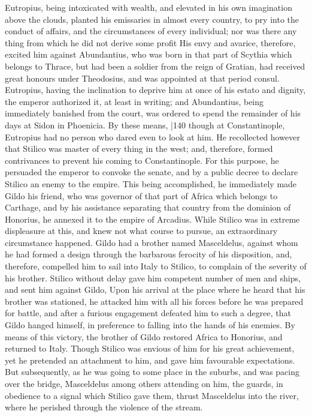 Eutropius, being intoxicated with wealth, and elevated in his own imagination above the clouds, planted his emissaries in almost every country, to pry into the conduct of affairs, and the circumstances of every individual; nor was there any thing from which he did not derive some profit His envy and avarice, therefore, excited him against Abundantius, who was born in that part of Scythia which belongs to Thrace, but had been a soldier from the reign of Gratian, had received great honours under Theodosius, and was appointed at that period consul. Eutropius, having the inclination to deprive him at once of his estato and dignity, the emperor authorized it, at least in writing; and Abundantius, being immediately banished from the court, was ordered to spend the remainder of his days at Sidon in Phoenicia. By these means,
|140 though at Constantinople, Eutropius had no person who dared even to look at him. He recollected however that Stilico was master of every thing in the west; and, therefore, formed contrivances to prevent his coming to Constantinople. For this purpose, he persuaded the emperor to convoke the senate, and by a public decree to declare Stilico an enemy to the empire. This being accomplished, he immediately made Gildo his friend, who was governor of that part of Africa which belongs to Carthage, and by his assistance separating that country from the dominion of Honorius, he annexed it to the empire of Arcadius. While Stilico was in extreme displeasure at this, and knew not what course to pursue, an extraordinary circumstance happened. Gildo had a brother named Masceldelus, against whom he had formed a design through the barbarous ferocity of his disposition, and, therefore, compelled him to sail into Italy to Stilico, to complain of the severity of his brother. Stilico without delay gave him competent number of men and ships, and sent him against Gildo, Upon his arrival at the place where he heard that his brother was stationed, he attacked him with all his forces before he was prepared for battle, and after a furious engagement defeated him to such a degree, that Gildo hanged himself, in preference to falling into the hands of his enemies. By means of this victory, the brother of Gildo restored Africa to Honorius, and returned to Italy. Though Stilico was envious of him for his great achievement, yet he pretended an attachment to him, and gave him favourable expectations. But subsequently, as he was going to some place in the suburbs, and was pacing over the bridge, Masceldelus among others attending on him, the guards, in obedience to a signal which Stilico gave them, thrust Masceldelus into the river, where he perished through the violence of the stream.

